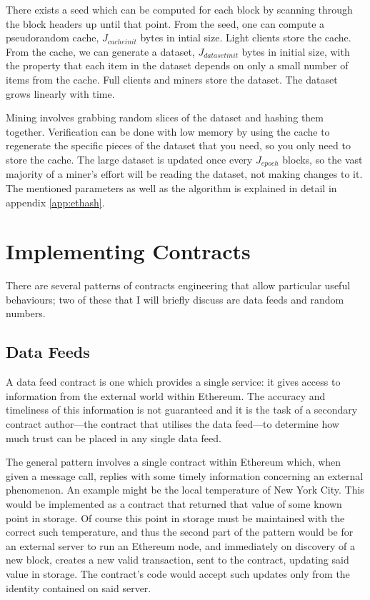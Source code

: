 \documentclass[9pt,oneside]{amsart}
\begin{document}
\begin{multicols}{2}
There exists a seed which can be computed for each block by scanning through the block headers up until that point. From the seed, one can compute a pseudorandom cache, $J_{cacheinit}$ bytes in intial size. Light clients store the cache. From the cache, we can generate a dataset, $J_{datasetinit}$ bytes in initial size, with the property that each item in the dataset depends on only a small number of items from the cache. Full clients and miners store the dataset. The dataset grows linearly with time.

Mining involves grabbing random slices of the dataset and hashing them together. Verification can be done with low memory by using the cache to regenerate the specific pieces of the dataset that you need, so you only need to store the cache. The large dataset is updated once every $J_{epoch}$ blocks, so the vast majority of a miner's effort will be reading the dataset, not making changes to it. The mentioned parameters as well as the algorithm is explained in detail in appendix \ref{app:ethash}.

\section{Implementing Contracts}

There are several patterns of contracts engineering that allow particular useful behaviours; two of these that I will briefly discuss are data feeds and random numbers. 

\subsection{Data Feeds}
A data feed contract is one which provides a single service: it gives access to information from the external world within Ethereum. The accuracy and timeliness of this information is not guaranteed and it is the task of a secondary contract author---the contract that utilises the data feed---to determine how much trust can be placed in any single data feed.

The general pattern involves a single contract within Ethereum which, when given a message call, replies with some timely information concerning an external phenomenon. An example might be the local temperature of New York City. This would be implemented as a contract that returned that value of some known point in storage. Of course this point in storage must be maintained with the correct such temperature, and thus the second part of the pattern would be for an external server to run an Ethereum node, and immediately on discovery of a new block, creates a new valid transaction, sent to the contract, updating said value in storage. The contract's code would accept such updates only from the identity contained on said server.


\end{multicols}
\end{document}
